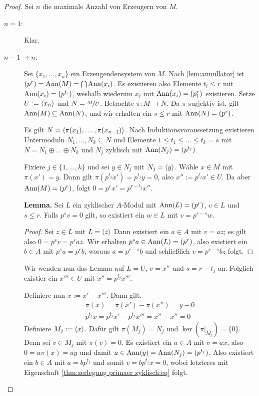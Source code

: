 \documentclass[12pt,a4paper]{scrartcl}
\theoremstyle{cplain}
\theoremstyle{cdef}
\begin{document}
\begin{proof}
	Sei $n$ die maximale Anzahl von Erzeugern von $M$.
	\begin{description}
		\item[$n = 1$:] Klar.
		\item[$n-1\to n$:] Sei $\{x_1,\dots, x_n\}$ ein Erzeugendensystem von $M$. Nach \cref{lem:annullator} ist $(p^r) = \operatorname{Ann}(M)  = \bigcap \operatorname{Ann}(x_i)$. Es existieren also Elemente $t_i\le r$ mit $\operatorname{Ann}(x_i) = (p^{t_i})$, weshalb wiederum $x_i$ mit $\operatorname{Ann}(x_i) = (p_i^r)$ existieren. Setze $U := \langle x_n\rangle$ und $N = \nicefrac{M}{U}$. Betrachte $\pi\colon M\to N$. Da $\pi$ surjektiv ist, gilt $\operatorname{Ann}(M)\subseteq \operatorname{Ann}(N)$, und wir erhalten ein $s\le r$ mit $\operatorname{Ann}(N) = (p^s)$.
		
		Es gilt $N = \langle\pi(x_1),\dots, \pi(x_{n-1})\rangle$. Nach Induktionsvoraussetzung existieren Untermoduln $N_1,\dots, N_k\subseteq N$ und Elemente $1\le t_1\le\dots \le t_k = s$ mit $N = N_1\oplus \dots \oplus N_k$ und $N_j$ zyklisch mit $\operatorname{Ann}(N_j) = (p^{t_j})$.
		
		
		Fixiere $j\in\{1,\dots, k\}$ und sei $y\in N_j$ mit $N_j = \langle y\rangle$. Wähle $x\in M$ mit $\pi(x') = y$. Dann gilt $\pi(p^{t_j}x') = p^{t_j}y = 0$, also $x'' := p^{t_j}x'\in U$. Da aber $\operatorname{Ann}(M) = (p^r)$, folgt $0 = p^rx' = p^{r-t_j}x''$.
		
		\textbf{Lemma.} Sei $L$ ein zyklischer $A$-Modul mit $\operatorname{Ann}(L) = (p^r)$, $v\in L$ und $s\le r$. Falls $p^sv = 0$ gilt, so existiert ein $w\in L$ mit $v = p^{r-s}w$.
		\begin{proof}
			Sei $z\in L$ mit $L = \langle z\rangle$ Dann existiert ein $a \in A$ mit $v = az$; es gilt also $0 = p^sv = p^saz$. Wir erhalten $p^sa\in \operatorname{Ann}(L) = (p^r)$, also existiert ein $b\in A$ mit $p^sa = p^rb$, woraus $a = p^{r-s}b$ und schließlich $v = p^{r-s}bz$ folgt.
		\end{proof}
			
		Wir wenden nun das Lemma auf $L = U$, $v = x''$ und $s = r-t_j$ an. Folglich existier ein $x'''\in U$ mit $x'' = p^{l_j}x'''$.
		
		Definiere nun $x := x'-x'''$. Dann gilt.
		\begin{gather*}
			\pi(x) = \pi(x')-\pi(x'') = y-0 \\
			p^{t_j}x = p^{t_j}x'-p^{t_j}x''' = x''-x'' = 0 \tag{*} \label{thm:zerlegung primaer zyklisch:eq}
		\end{gather*}
		Definiere $M_j := \langle x\rangle$. Dafür gilt $\pi(M_j) = N_j$ und $\ker(\pi|_{M_j}) = \{0\}$. Denn sei $v\in M_j$ mit $\pi(v) = 0$. Es existiert ein $a\in A$ mit $v = ax$, also $0 = a\pi(x) = ay$ und damit $a \in \operatorname{Ann}(y) = \operatorname{Ann}(N_j) = (p^{t_j})$. Also existiert ein $b\in A$ mit $a = bp^{t_j}$ und somit $v = bp^{t_j}x  = 0$, wobei letzteres mit Eigenschaft \eqref{thm:zerlegung primaer zyklisch:eq} folgt.
		

\end{description}
\end{proof}
\end{document}
